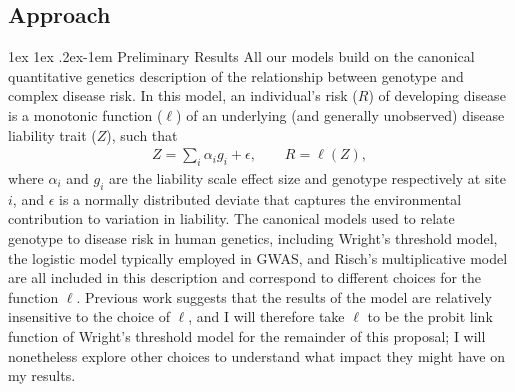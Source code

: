 \message{ !name(ResearchStrategy.tex)}\documentclass[11pt]{article}
\makeatletter
\renewcommand{\paragraph}{%
  \@startsection{paragraph}{4}%
  {\z@}{1ex \@plus 1ex \@minus .2ex}{-1em}%
  {\normalfont\normalsize\bfseries}%
}
\makeatother
\begin{document}


\setlength{\abovedisplayskip}{3.5pt}
\setlength{\belowdisplayskip}{3.5pt}

\subsection*{Approach}
\paragraph{Preliminary Results}
All our models build on the canonical quantitative genetics description of the relationship between genotype and complex disease risk. In this model, an individual's risk ($R$) of developing disease is a monotonic function ($\ell$) of an underlying (and generally unobserved) disease liability trait ($Z$), such that
\begin{align}
    Z = \sum_{i}\alpha_ig_i + \epsilon, \qquad   R=\ell(Z),
\end{align}
where $\alpha_i$ and $g_i$ are the liability scale effect size and genotype respectively at site $i$, and $\epsilon$ is a normally distributed deviate that captures the environmental contribution to variation in liability. The canonical models used to relate genotype to disease risk in human genetics, including Wright's threshold model\cite{Wright:1934wd,Lush:1948vc,FalconerAndMackay,Falconer:1965bn}, the logistic model typically employed in GWAS\cite{Risch:1996ub}, and Risch's multiplicative model \cite{Risch:1990ty} are all included in this description and correspond to different choices for the function $\ell$. Previous work \cite{Slatkin:2008hw, Wray:2010ir} suggests that the results of the model are relatively insensitive to the choice of $\ell$, and I will therefore take $\ell$ to be the probit link function of Wright's threshold model for the remainder of this proposal; I will nonetheless explore other choices to understand what impact they might have on my results.
\end{document}
